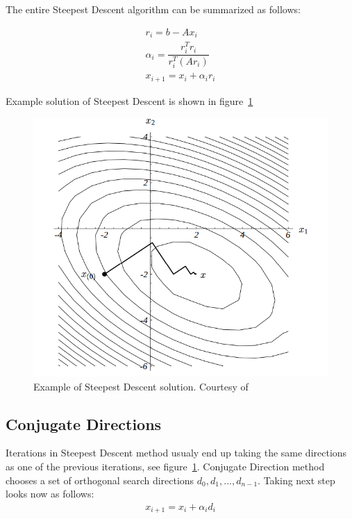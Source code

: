 \documentclass[en]{minipw} %
\begin{document}
The entire Steepest Descent algorithm can be summarized as follows:

\begin{equation}
\begin{aligned}
r_{i} = b - Ax_{i}
\\
\alpha_{i} = \dfrac{r_{i}^{T}r_{i}}{r_{i}^{T} (Ar_{i})}
\\
x_{i+1} = x_{i} + \alpha_{i}r_{i}
\end{aligned}
\end{equation}

Example solution of Steepest Descent is shown in figure~\ref{fig:steepest_descent}

\begin{figure}[h!]
\centering
\includegraphics[scale=0.5]{pictures/steepest_descent.png}
\caption[Logo MiNI]{Example of Steepest Descent solution. Courtesy of~\cite{cg}}
\label{fig:steepest_descent}
\end{figure}

\subsection{Conjugate Directions}
Iterations in Steepest Descent method usualy end up taking the same directions as one of the previous iterations, see figure~\ref{fig:steepest_descent}. Conjugate Direction method chooses a set of orthogonal search directions $d_0, d_1,...,d_{n-1}$. Taking next step looks now as follows:
\begin{equation}
\begin{aligned}
x_{i+1} = x_{i} + \alpha_{i}d_{i}
\end{aligned}
\end{equation}
\end{document}
